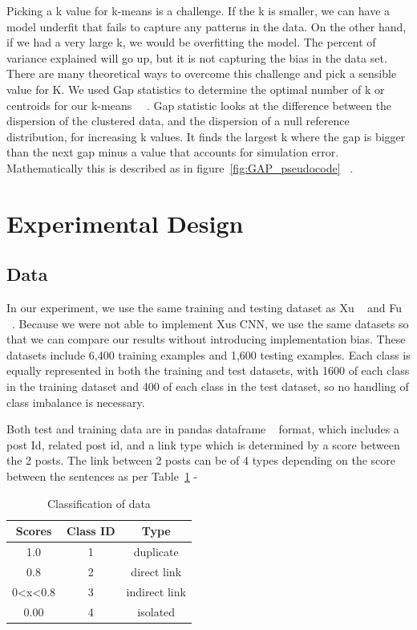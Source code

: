 \documentclass[sigconf]{acmart}
\theoremstyle{break}
\begin{document}
    Picking a k value for k-means is a challenge. If the k is smaller, we can have a model underfit that fails to capture any patterns in the data. On the other hand, if we had a very large k, we would be overfitting the model. The percent of variance explained will go up, but it is not capturing the bias in the data set. There are many theoretical ways to overcome this challenge and pick a sensible value for K. We used Gap statistics to determine the optimal number of k or centroids for our k-means ~\cite{mohajer2011comparison}~\cite{tibshirani2001estimating}. Gap statistic looks at the difference between the dispersion of the clustered data, and the dispersion of a null reference distribution, for increasing k values. It finds the largest k where the gap is bigger than the next gap minus a value that accounts for simulation error. Mathematically this is described as in figure~\ref{fig:GAP_pseudocode} ~\cite{tibshirani2001estimating}.

\section{Experimental Design}
\label{sect: Experimental Design}
    \subsection{Data}
    \label{sssec:Data}
    In our experiment, we use the same training and testing dataset as Xu ~\cite{xu2016predicting} and Fu ~\cite{fu2017easy}. Because we were not able to implement Xu\textquotesingle s CNN, we use the same datasets so that we can compare our results without introducing implementation bias. These datasets include 6,400 training examples and 1,600 testing examples. Each class is equally represented in both the training and test datasets, with 1600 of each class in the training dataset and 400 of each class in the test dataset, so no handling of class imbalance is necessary.
    
    Both test and training data are in pandas dataframe ~\cite{mckinney2011pandas} format, which includes a post Id, related post id, and a link type which is determined by a score between the 2 posts. The link between 2 posts can be of 4 types depending on the score between the sentences as per Table~\ref{tab:data_classl} - 
    
    \begin{table}[h!]
        \centering
        \begin{tabular}{c|c|c}
            \textbf{Scores} & \textbf{Class ID} & \textbf{Type} \\
            \hline
            1.0 & 1 & duplicate  \\
            \hline
            0.8 & 2 & direct link \\
            \hline
            0<x<0.8 & 3 & indirect link \\
            \hline
            0.00 & 4 & isolated \\
            \hline
        \end{tabular}
        \caption{Classification of data}
        \label{tab:data_classl}
    \end{table}
    
\end{document}
